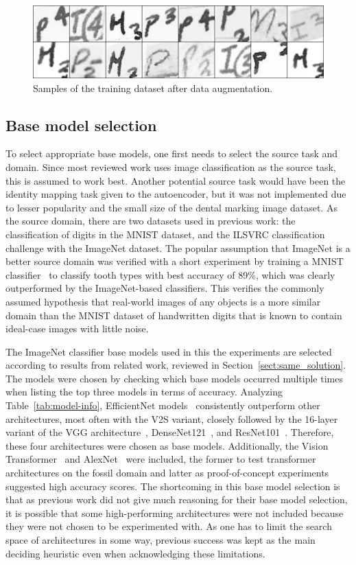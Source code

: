 \documentclass[english,twoside,openright]{UH_DS_MSc}
\begin{document}
\begin{figure}[ht]
    \centering
    \includegraphics*[scale=.2]{images/augmented.png}
    \caption{Samples of the training dataset after data augmentation.}
    \label{image:augmented}
\end{figure}

\subsection{Base model selection}

To select appropriate base models, one first needs to select the source task and domain. Since most reviewed work uses image classification as the source task, this is assumed to work best.
Another potential source task would have been the identity mapping task given to the autoencoder,
but it was not implemented due to lesser popularity and the small size of the dental marking image dataset.
As the source domain, there are two datasets used in previous work: the classification of digits in the MNIST dataset, 
and the ILSVRC classification challenge with the ImageNet dataset. The popular 
assumption that ImageNet is a better source domain was verified with a short experiment by training a MNIST classifier~\cite{jamilemnist}
to classify tooth types with best accuracy of 89\%, which was clearly outperformed by the ImageNet-based classifiers. This verifies the commonly assumed hypothesis that real-world images of any objects is a more 
similar domain than the MNIST dataset of handwritten digits that is known to contain ideal-case images with little noise.

The ImageNet classifier base models used in this the experiments are selected 
according to results from related work, reviewed in Section~\ref{sect:same_solution}.
The models were chosen by checking which base models 
occurred multiple times when listing the top three models in terms of accuracy. 
Analyzing Table~\ref{tab:model-info}, EfficientNet models~\cite{efficientnetv2} consistently outperform 
other architectures, most often with the V2S variant, closely followed by the 16-layer variant of the VGG architecture~\cite{vgg},
DenseNet121~\cite{densenet}, and ResNet101~\cite{resnet}.
Therefore, these four architectures were chosen as base models.
Additionally, the Vision Transformer~\cite{vit} and AlexNet~\cite{alexnet} were included, the former to test 
transformer architectures on the fossil domain and latter
as proof-of-concept experiments suggested high accuracy scores.
The shortcoming in this base model selection is that as previous work did not give much
 reasoning for their base model selection, it is possible that some high-performing architectures were not included 
because  they were not chosen to be experimented with. As one has to limit the 
search space of architectures in some way, previous success was kept as the main deciding heuristic 
even when acknowledging these limitations.
\end{document}
